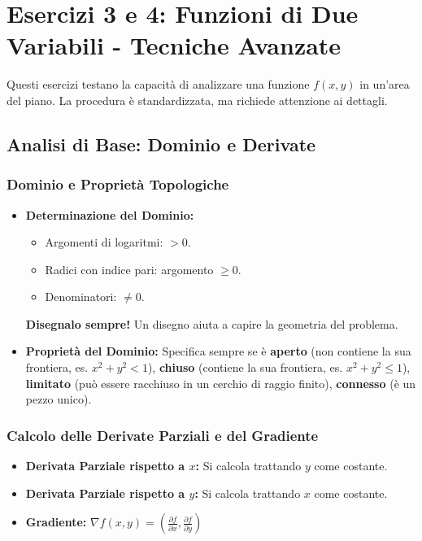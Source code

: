 \section{Esercizi 3 e 4: Funzioni di Due Variabili - Tecniche Avanzate}
Questi esercizi testano la capacità di analizzare una funzione $f(x,y)$ in un'area del piano. La procedura è standardizzata, ma richiede attenzione ai dettagli.

\subsection{Analisi di Base: Dominio e Derivate}

\subsubsection{Dominio e Proprietà Topologiche}
\begin{itemize}
    \item \textbf{Determinazione del Dominio:} 
    \begin{itemize}
        \item Argomenti di logaritmi: $> 0$. 
        \item Radici con indice pari: argomento $\ge 0$. 
        \item Denominatori: $\neq 0$.
    \end{itemize}
    \textbf{Disegnalo sempre!} Un disegno aiuta a capire la geometria del problema.
    \item \textbf{Proprietà del Dominio:} Specifica sempre se è \textbf{aperto} (non contiene la sua frontiera, es. $x^2+y^2 < 1$), \textbf{chiuso} (contiene la sua frontiera, es. $x^2+y^2 \le 1$), \textbf{limitato} (può essere racchiuso in un cerchio di raggio finito), \textbf{connesso} (è un pezzo unico). 
\end{itemize}

\subsubsection{Calcolo delle Derivate Parziali e del Gradiente}
\begin{itemize}
    \item \textbf{Derivata Parziale rispetto a $x$:} Si calcola trattando $y$ come costante.
    \item \textbf{Derivata Parziale rispetto a $y$:} Si calcola trattando $x$ come costante.
    \item \textbf{Gradiente:} $\nabla f(x,y) = \left( \frac{\partial f}{\partial x}, \frac{\partial f}{\partial y} \right)$
\end{itemize}

